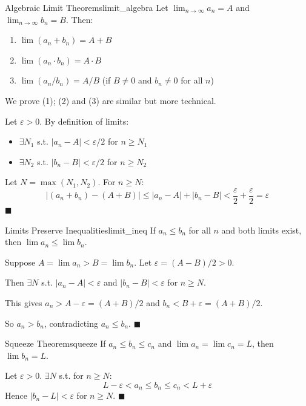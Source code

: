 \documentclass[11pt, letterpaper, openany]{book}
\renewenvironment{proof}[1][\proofname]{%
  \tcolorbox[blanker, breakable, left=1em,
    before skip=1em, after skip=1em,
    borderline west={2pt}{0pt}{MagicTeal!50},
    colback=MagicCream,
    before upper={\textcolor{MagicTeal}{\sffamily\bfseries #1.}\space}
  ]%
}{%
  \hfill\textcolor{MagicTeal}{\ensuremath{\blacksquare}}\endtcolorbox%
}
\begin{document}
\begin{thm}{Algebraic Limit Theorems}{limit_algebra}
Let $\lim_{n \to \infty} a_n = A$ and $\lim_{n \to \infty} b_n = B$. Then:
\begin{enumerate}
    \item $\lim(a_n + b_n) = A + B$
    \item $\lim(a_n \cdot b_n) = A \cdot B$
    \item $\lim(a_n / b_n) = A/B$ (if $B \neq 0$ and $b_n \neq 0$ for all $n$)
\end{enumerate}
\end{thm}

\begin{proof}
We prove (1); (2) and (3) are similar but more technical.

Let $\varepsilon > 0$. By definition of limits:
\begin{itemize}
    \item $\exists N_1$ s.t. $|a_n - A| < \varepsilon/2$ for $n \geq N_1$
    \item $\exists N_2$ s.t. $|b_n - B| < \varepsilon/2$ for $n \geq N_2$
\end{itemize}

Let $N = \max(N_1, N_2)$. For $n \geq N$:
\[|(a_n + b_n) - (A + B)| \leq |a_n - A| + |b_n - B| < \frac{\varepsilon}{2} + \frac{\varepsilon}{2} = \varepsilon\]
\end{proof}

\begin{lem}{Limits Preserve Inequalities}{limit_ineq}
If $a_n \leq b_n$ for all $n$ and both limits exist, then $\lim a_n \leq \lim b_n$.
\end{lem}

\begin{proof}
Suppose $A = \lim a_n > B = \lim b_n$. Let $\varepsilon = (A - B)/2 > 0$.

Then $\exists N$ s.t. $|a_n - A| < \varepsilon$ and $|b_n - B| < \varepsilon$ for $n \geq N$.

This gives $a_n > A - \varepsilon = (A + B)/2$ and $b_n < B + \varepsilon = (A + B)/2$.

So $a_n > b_n$, contradicting $a_n \leq b_n$.
\end{proof}

\begin{thm}{Squeeze Theorem}{squeeze}
If $a_n \leq b_n \leq c_n$ and $\lim a_n = \lim c_n = L$, then $\lim b_n = L$.
\end{thm}

\begin{proof}
Let $\varepsilon > 0$. $\exists N$ s.t. for $n \geq N$:
\[L - \varepsilon < a_n \leq b_n \leq c_n < L + \varepsilon\]
Hence $|b_n - L| < \varepsilon$ for $n \geq N$.
\end{proof}
\end{document}
